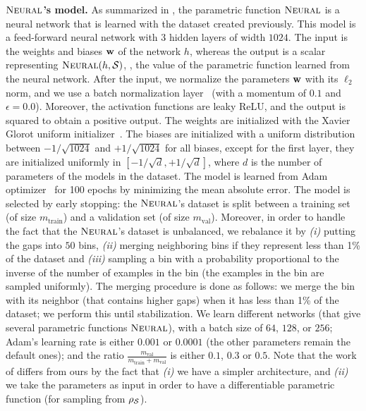 \documentclass[twoside]{article}
\theoremstyle{plain}
\begin{document}
\textbf{$\text{\sc Neural}$'s model.} 
As summarized in , the parametric function $\text{\sc Neural}$ is a neural network that is learned with the dataset created previously.
This model is a feed-forward neural network with $3$ hidden layers of width $1024$.
The input is the weights and biases $\mathbf{w}$ of the network $h$, whereas the output is a scalar representing $\text{\sc Neural}(h,\mathcal{S})$, \ie, the value of the parametric function learned from the neural network.
After the input, we normalize the parameters $\mathbf{w}$ with its $\ell_2$ norm, and we use a batch normalization layer~\citep{ioffe2015batch} (with a momentum of $0.1$ and $\epsilon=0.0$). 
Moreover, the activation functions are leaky ReLU, and the output is squared to obtain a positive output.
The weights are initialized with the Xavier Glorot uniform initializer~\citep{glorot2010understanding}.
The biases are initialized with a uniform distribution between $-1/\sqrt{1024}$ and $+1/\sqrt{1024}$ for all biases, except for the first layer, they are initialized uniformly in $[-1/\sqrt{d}, +1/\sqrt{d}]$, where $d$ is the number of parameters of the models in the dataset.
The model is learned from Adam optimizer~\citep{kingma2015adam} for 100 epochs by minimizing the mean absolute error.
The model is selected by early stopping: the $\text{\sc Neural}$'s dataset is split between a training set (of size $m_{\text{train}}$) and a validation set (of size $m_{\text{val}}$).
Moreover, in order to handle the fact that the $\text{\sc Neural}$'s dataset is unbalanced, we rebalance it by {\it (i)} putting the gaps into $50$ bins, {\it (ii)} merging neighboring bins if they represent less than 1\% of the dataset and {\it (iii)} sampling a bin with a probability proportional to the inverse of the number of examples in the bin (the examples in the bin are sampled uniformly).
The merging procedure is done as follows: we merge the bin with its neighbor (that contains higher gaps) when it has less than 1\% of the dataset; we perform this until stabilization.
We learn different networks (that give several parametric functions $\text{\sc Neural}$), with a batch size of $64$, $128$, or $256$; Adam's learning rate is either $0.001$ or $0.0001$ (the other parameters remain the default ones); and the ratio $\frac{m_{\text{val}}}{m_{\text{train}}+m_{\text{val}}}$ is either $0.1$, $0.3$ or $0.5$.
Note that the work of \citet{lee2020neural} differs from ours by the fact that {\it (i)} we have a simpler architecture, and {\it (ii)} we take the parameters as input in order to have a differentiable parametric function (for sampling from $\rho_{\mathcal{S}}$).
\end{document}
